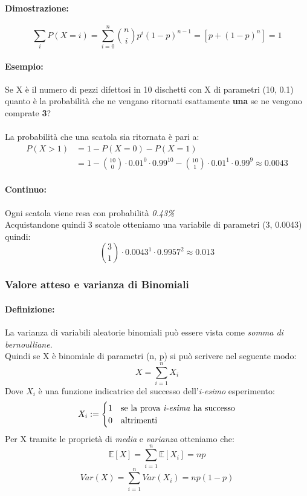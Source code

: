 \documentclass[]{article}
\newcommand{\ev}{\mathbb{E}[X]}
\renewcommand{\ev}[1]{\mathbb{E}[#1]}
\newcommand{\definizione}{\paragraph{Definizione:}}
\begin{document}
    \paragraph{Dimostrazione:}
    \[ \sum_{i}^{} P(X = i) = \sum_{i = 0}^{n} \binom{n}{i} p^i (1-p)^{n-1} = [p + (1 - p)^n] = 1 \]


    \paragraph{Esempio:} Se X è il numero di pezzi difettosi in 10 dischetti con X di parametri (10, 0.1) quanto è
    la probabilità che ne vengano ritornati esattamente \textbf{una} se ne vengono comprate \textbf{3}? \\ \\
    La probabilità che una scatola sia ritornata è pari a:
    \begin{equation*}
        \begin{split}
            P(X > 1) &= 1 - P(X = 0) - P(X = 1) \\
            & = 1 - \binom{10}{0} \cdot 0.01^0 \cdot 0.99^{10} - \binom{10}{1} \cdot 0.01^1 \cdot 0.99^9 \approx 0.0043
        \end{split}
    \end{equation*}
    \paragraph{Continuo:} Ogni scatola viene resa con probabilità \textit{0.43\%} \\
    Acquistandone quindi 3 scatole otteniamo una variabile di parametri (3, 0.0043) quindi:
    \[ \binom{3}{1} \cdot 0.0043^1 \cdot 0.9957^2 \approx 0.013 \]

    \subsubsection{Valore atteso e varianza di Binomiali}
    \definizione La varianza di variabili aleatorie binomiali può essere vista come \textit{somma di bernoulliane}. \\
    Quindi se X è binomiale di parametri (n, p) si può scrivere nel seguente modo:
    \[ X = \sum_{i = 1}^{n} X_i \]
    Dove $X_i$ è una funzione indicatrice del successo dell'\textit{i-esimo} esperimento:
    \begin{equation*}
        X_i :=
        \begin{cases}
            1 & \text{se la prova \textit{i-esima} ha successo} \\
            0 & \text{altrimenti}
        \end{cases}
    \end{equation*}
    Per X tramite le proprietà di \textit{media} e \textit{varianza} otteniamo che:
    \[ \ev{X} = \sum_{i = 1}^{n} \ev{X_i} = np \]
    \[ Var(X) = \sum_{i = 1}^{n} Var(X_i) = np(1 - p) \]
\end{document}
